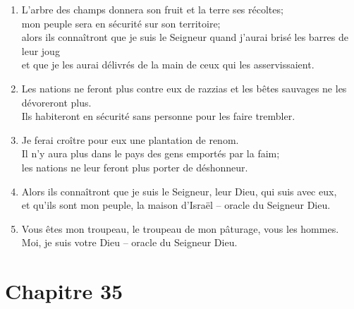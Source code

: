 \documentclass[12pt,a4paper,titlepage]{article}
\def \pslabelsep{0.2em} %
\def \psleftmargin{0em} %
\begin{document}
\begin{enumerate}[leftmargin=\psleftmargin, labelsep = \pslabelsep, label={\arabic*}, font=\color{\pscolor}\small\textsuperscript, parsep=0em, itemsep=0em, topsep=0em ]
\item L’arbre des champs donnera son fruit et la terre ses récoltes; \\ mon peuple sera en sécurité sur son territoire; \\ alors ils connaîtront que je suis le Seigneur quand j’aurai brisé les barres de leur joug \\ et que je les aurai délivrés de la main de ceux qui les asservissaient.
\item Les nations ne feront plus contre eux de razzias et les bêtes sauvages ne les dévoreront plus. \\ Ils habiteront en sécurité sans personne pour les faire trembler.
\item Je ferai croître pour eux une plantation de renom. \\ Il n’y aura plus dans le pays des gens emportés par la faim; \\ les nations ne leur feront plus porter de déshonneur.
\item Alors ils connaîtront que je suis le Seigneur, leur Dieu, qui suis avec eux, \\ et qu’ils sont mon peuple, la maison d’Israël – oracle du Seigneur Dieu.
\item Vous êtes mon troupeau, le troupeau de mon pâturage, vous les hommes. \\ Moi, je suis votre Dieu – oracle du Seigneur Dieu.
\end{enumerate}
\newpage


\section*{Chapitre 35}
\end{document}
